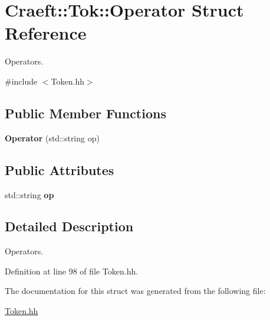 \hypertarget{struct_craeft_1_1_tok_1_1_operator}{}\section{Craeft\+:\+:Tok\+:\+:Operator Struct Reference}
\label{struct_craeft_1_1_tok_1_1_operator}


Operators.  




{\ttfamily \#include $<$Token.\+hh$>$}

\subsection*{Public Member Functions}
\begin{DoxyCompactItemize}
\item 
\hypertarget{struct_craeft_1_1_tok_1_1_operator_a181a1f4d3d94cc46cd69e95ee0a827cb}{}\label{struct_craeft_1_1_tok_1_1_operator_a181a1f4d3d94cc46cd69e95ee0a827cb} 
{\bfseries Operator} (std\+::string op)
\end{DoxyCompactItemize}
\subsection*{Public Attributes}
\begin{DoxyCompactItemize}
\item 
\hypertarget{struct_craeft_1_1_tok_1_1_operator_aba2aae639d4decca354ae44999e8907c}{}\label{struct_craeft_1_1_tok_1_1_operator_aba2aae639d4decca354ae44999e8907c} 
std\+::string {\bfseries op}
\end{DoxyCompactItemize}


\subsection{Detailed Description}
Operators. 

Definition at line 98 of file Token.\+hh.



The documentation for this struct was generated from the following file\+:\begin{DoxyCompactItemize}
\item 
\hyperlink{_token_8hh}{Token.\+hh}\end{DoxyCompactItemize}
